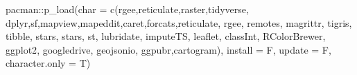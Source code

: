 \documentclass[
  letterpaper,
  DIV=11,
  numbers=noendperiod]{scrartcl}
\newenvironment{Shaded}{\begin{snugshade}}{\end{snugshade}}
\newcommand{\AttributeTok}[1]{\textcolor[rgb]{0.40,0.45,0.13}{#1}}
\newcommand{\FunctionTok}[1]{\textcolor[rgb]{0.28,0.35,0.67}{#1}}
\newcommand{\NormalTok}[1]{\textcolor[rgb]{0.00,0.23,0.31}{#1}}
\newcommand{\SpecialCharTok}[1]{\textcolor[rgb]{0.37,0.37,0.37}{#1}}
\newcommand{\StringTok}[1]{\textcolor[rgb]{0.13,0.47,0.30}{#1}}
\begin{document}
\begin{Shaded}
\begin{Highlighting}[]
\NormalTok{pacman}\SpecialCharTok{::}\FunctionTok{p\_load}\NormalTok{(}\AttributeTok{char =} \FunctionTok{c}\NormalTok{(}\StringTok{\textquotesingle{}rgee\textquotesingle{}}\NormalTok{,}\StringTok{\textquotesingle{}reticulate\textquotesingle{}}\NormalTok{,}\StringTok{\textquotesingle{}raster\textquotesingle{}}\NormalTok{,}\StringTok{\textquotesingle{}tidyverse\textquotesingle{}}\NormalTok{,}
                \StringTok{\textquotesingle{}dplyr\textquotesingle{}}\NormalTok{,}\StringTok{\textquotesingle{}sf\textquotesingle{}}\NormalTok{,}\StringTok{\textquotesingle{}mapview\textquotesingle{}}\NormalTok{,}\StringTok{\textquotesingle{}mapeddit\textquotesingle{}}\NormalTok{,}\StringTok{\textquotesingle{}caret\textquotesingle{}}\NormalTok{,}\StringTok{\textquotesingle{}forcats\textquotesingle{}}\NormalTok{,}\StringTok{\textquotesingle{}reticulate\textquotesingle{}}\NormalTok{,}
                \StringTok{\textquotesingle{}rgee\textquotesingle{}}\NormalTok{, }\StringTok{\textquotesingle{}remotes\textquotesingle{}}\NormalTok{, }\StringTok{\textquotesingle{}magrittr\textquotesingle{}}\NormalTok{, }\StringTok{\textquotesingle{}tigris\textquotesingle{}}\NormalTok{, }\StringTok{\textquotesingle{}tibble\textquotesingle{}}\NormalTok{, }\StringTok{\textquotesingle{}stars\textquotesingle{}}\NormalTok{,                       }\StringTok{\textquotesingle{}stars\textquotesingle{}}\NormalTok{,}
                \StringTok{\textquotesingle{}st\textquotesingle{}}\NormalTok{, }\StringTok{\textquotesingle{}lubridate\textquotesingle{}}\NormalTok{, }\StringTok{\textquotesingle{}imputeTS\textquotesingle{}}\NormalTok{, }\StringTok{\textquotesingle{}leaflet\textquotesingle{}}\NormalTok{, }\StringTok{\textquotesingle{}classInt\textquotesingle{}}\NormalTok{,                            }\StringTok{\textquotesingle{}RColorBrewer\textquotesingle{}}\NormalTok{,}
                \StringTok{\textquotesingle{}ggplot2\textquotesingle{}}\NormalTok{, }\StringTok{\textquotesingle{}googledrive\textquotesingle{}}\NormalTok{, }\StringTok{\textquotesingle{}geojsonio\textquotesingle{}}\NormalTok{, }\StringTok{\textquotesingle{}ggpubr\textquotesingle{}}\NormalTok{,}\StringTok{\textquotesingle{}cartogram\textquotesingle{}}\NormalTok{),}
               \AttributeTok{install =}\NormalTok{ F, }\AttributeTok{update =}\NormalTok{ F, }\AttributeTok{character.only =}\NormalTok{ T)}
\end{Highlighting}
\end{Shaded}
\end{document}
